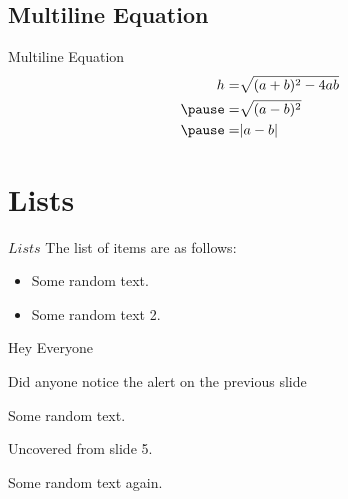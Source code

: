 \documentclass{beamer}
\begin{document}
        \subsection{Multiline Equation}
        \begin{frame}{Multiline Equation}
            \begin{equation}
                \begin{aligned}
                    h = & \sqrt{(a+b)^2-4ab} \\ \pause
                      = & \sqrt{(a-b)^2} \\ \pause
                      = & |a-b|   
                \end{aligned}
            \end{equation}
        \end{frame}
        
        \section{Lists}
        
        \begin{frame}{$Lists$}
            The list of items are as follows:
                \begin{itemize}
                    \item <+-| alert@+> Some random text.
                    \item <+-| alert@+> Some random text 2.
                \end{itemize}
                
                \begin{enumerate}
                    {}{ \item \alert{Hey Everyone}}{ \item Did anyone notice the alert on the previous slide} \pause
                    \item  Some random text.
                \end{enumerate}
                
                \begin{description}[<+->]
                    {\item[LOL]  Uncovered from slide 5.}
                    { \item[ROFL] Some random text again.}
                \end{description}
        \end{frame}
    
\end{document}
